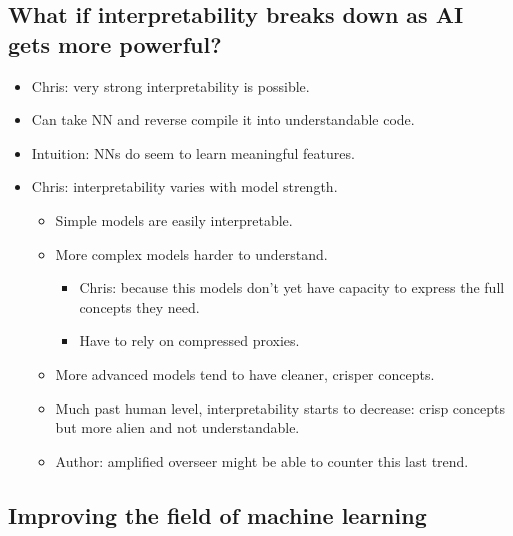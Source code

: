\subsection{What if interpretability breaks down as AI gets more powerful?}

\begin{itemize}
    \item Chris: very strong interpretability is possible.
    \item Can take NN and reverse compile it into understandable code.
    \item Intuition: NNs do seem to learn meaningful features.
    \item Chris: interpretability varies with model strength.
    \begin{itemize}
        \item Simple models are easily interpretable.
        \item More complex models harder to understand.
        \begin{itemize}
            \item Chris: because this models don't yet have capacity to express the full concepts they need.
            \item Have to rely on compressed proxies.
        \end{itemize}
        \item More advanced models tend to have cleaner, crisper concepts.
        \item Much past human level, interpretability starts to decrease: crisp concepts but more alien and not understandable.
        \item Author: amplified overseer might be able to counter this last trend.
    \end{itemize}
\end{itemize}


\subsection{Improving the field of machine learning}

